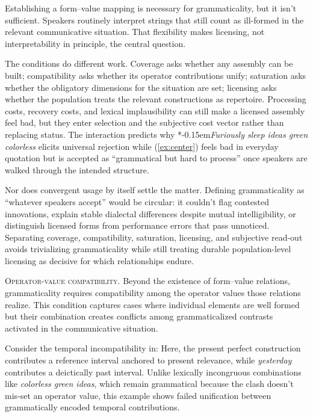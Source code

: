 \documentclass[12pt,letterpaper]{article}
\newcommand{\mention}[1]{\textit{#1}}
\newcommand{\judgesep}{\kern-0.15em}
\newcommand{\ungram}[1]{*\judgesep#1}
\begin{document}
Establishing a form--value mapping is necessary for grammaticality, but it isn't sufficient. Speakers routinely interpret strings that still count as ill-formed in the relevant communicative situation. That flexibility makes licensing, not interpretability in principle, the central question.

The conditions do different work. Coverage asks whether any assembly can be built; compatibility asks whether its operator contributions unify; saturation asks whether the obligatory dimensions for the situation are set; licensing asks whether the population treats the relevant constructions as repertoire. Processing costs, recovery costs, and lexical implausibility can still make a licensed assembly feel bad, but they enter selection and the subjective cost vector rather than replacing status. The interaction predicts why \ungram{\mention{Furiously sleep ideas green colorless}} elicits universal rejection while (\ref{ex:center}) feels bad in everyday quotation but is accepted as \enquote{grammatical but hard to process} once speakers are walked through the intended structure.

Nor does convergent usage by itself settle the matter. Defining grammaticality as \enquote{whatever speakers accept} would be circular: it couldn't flag contested innovations, explain stable dialectal differences despite mutual intelligibility, or distinguish licensed forms from performance errors that pass unnoticed. Separating coverage, compatibility, saturation, licensing, and subjective read-out avoids trivializing grammaticality while still treating durable population-level licensing as decisive for which relationships endure.

\noindent\textsc{Operator-value compatibility.} Beyond the existence of form--value relations, grammaticality requires compatibility among the operator values those relations realize. This condition captures cases where individual elements are well formed but their combination creates conflicts among grammaticalized contrasts activated in the communicative situation.

Consider the temporal incompatibility in:
\ea[*]{\mention{I've finished it yesterday.}}\label{ex:tense-sem}
\z
Here, the present perfect construction contributes a reference interval anchored to present relevance, while \mention{yesterday} contributes a deictically past interval. Unlike lexically incongruous combinations like \mention{colorless green ideas}, which remain grammatical because the clash doesn't mis-set an operator value, this example shows failed unification between grammatically encoded temporal contributions.
\end{document}
